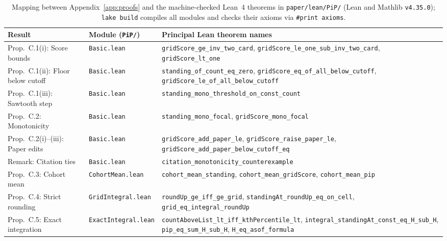 \documentclass[11pt]{article}
\begin{document}
\begin{table}[t]
  \centering
  \footnotesize
  \setlength{\tabcolsep}{4pt}
  \caption{Mapping between Appendix~\ref{app:proofs} and the machine-checked Lean~4 theorems in \texttt{paper/lean/PiP/}
  (Lean and Mathlib \texttt{v4.35.0}); \texttt{lake build} compiles all modules and checks their axioms via
  \texttt{\#print axioms}.}
  \label{tab:lean}
  \begin{tabular}{llp{7.9cm}}
    \toprule
    Result & Module (\texttt{PiP/}) & Principal Lean theorem names \tabularnewline
    \midrule
    Prop.\ C.1(i): Score bounds & \texttt{Basic.lean} &
      \raggedright\texttt{gridScore\_ge\_inv\_two\_card}, \texttt{gridScore\_le\_one\_sub\_inv\_two\_card}, \texttt{gridScore\_lt\_one} \tabularnewline
    Prop.\ C.1(ii): Floor below cutoff & \texttt{Basic.lean} &
      \raggedright\texttt{standing\_of\_count\_eq\_zero}, \texttt{gridScore\_eq\_of\_all\_below\_cutoff}, \texttt{gridScore\_le\_of\_all\_below\_cutoff} \tabularnewline
    Prop.\ C.1(iii): Sawtooth step & \texttt{Basic.lean} &
      \raggedright\texttt{standing\_mono\_threshold\_on\_const\_count} \tabularnewline
    Prop.\ C.2: Monotonicity & \texttt{Basic.lean} &
      \raggedright\texttt{standing\_mono\_focal}, \texttt{gridScore\_mono\_focal} \tabularnewline
    Prop.\ C.2(i)--(iii): Paper edits & \texttt{Basic.lean} &
      \raggedright\texttt{gridScore\_add\_paper\_le}, \texttt{gridScore\_raise\_paper\_le}, \texttt{gridScore\_add\_paper\_below\_cutoff\_eq} \tabularnewline
    Remark: Citation ties & \texttt{Basic.lean} &
      \raggedright\texttt{citation\_monotonicity\_counterexample} \tabularnewline
    Prop.\ C.3: Cohort mean & \texttt{CohortMean.lean} &
      \raggedright\texttt{cohort\_mean\_standing}, \texttt{cohort\_mean\_gridScore}, \texttt{cohort\_mean\_pip} \tabularnewline
    Prop.\ C.4: Strict rounding & \texttt{GridIntegral.lean} &
      \raggedright\texttt{roundUp\_ge\_iff\_ge\_grid}, \texttt{standingAt\_roundUp\_eq\_on\_cell}, \texttt{grid\_eq\_integral\_roundUp} \tabularnewline
    Prop.\ C.5: Exact integration & \texttt{ExactIntegral.lean} &
      \raggedright\texttt{countAboveList\_lt\_iff\_kthPercentile\_lt}, \texttt{integral\_standingAt\_const\_eq\_H\_sub\_H}, \texttt{pip\_eq\_sum\_H\_sub\_H}, \texttt{H\_eq\_asof\_formula} \tabularnewline
    \bottomrule
  \end{tabular}
\end{table}
\end{document}
